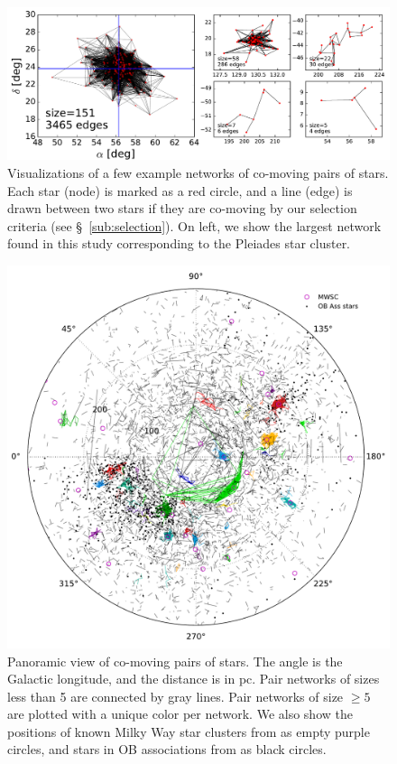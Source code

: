 \documentclass[manuscript, letterpaper]{aastex6}
\begin{document}
\begin{figure}[htbp]
  \begin{center}
    \includegraphics[width=\textwidth]{figures/graphviz_examples.pdf}
  \end{center}
  \caption{%
    Visualizations of a few example networks of co-moving pairs of stars.
    Each star (node) is marked as a red circle, and a line (edge) is drawn
    between two stars if they are co-moving by our selection criteria
    (see \S~\ref{sub:selection}). On left, we show the largest network
    found in this study corresponding to the Pleiades star cluster.
    \label{fig:graphviz_examples}}
\end{figure}

\begin{figure}[htbp]
  \begin{center}
    \includegraphics[width=\textwidth]{figures/glon_d_pie.pdf}
  \end{center}
  \caption{%
    Panoramic view of co-moving pairs of stars. The angle is the Galactic
    longitude, and the distance is in pc.
    Pair networks of sizes less than 5 are connected by gray lines.
    Pair networks of size $\geq 5$ are plotted with a unique color per network.
    We also show the positions of known Milky Way star clusters
    from \citet{Kharchenko:2016aa} as empty purple circles,
    and stars in OB associations from \citet{de-Zeeuw:1999aa} as
    black circles.
    \label{fig:glon_d_pairlines}}
\end{figure}
\end{document}
